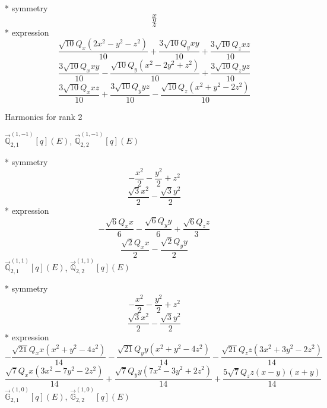 \documentclass[fleqn,8pt]{jsarticle}
\begin{document}
\noindent\quad ** symmetry
\begin{dmath*}
x
\end{dmath*}
\begin{dmath*}
y
\end{dmath*}
\begin{dmath*}
z
\end{dmath*}
\noindent\quad ** expression
\begin{dmath*}
\frac{\sqrt{10} Q_{x} \left(2 x^{2} - y^{2} - z^{2}\right)}{10} + \frac{3 \sqrt{10} Q_{y} x y}{10} + \frac{3 \sqrt{10} Q_{z} x z}{10}
\end{dmath*}
\begin{dmath*}
\frac{3 \sqrt{10} Q_{x} x y}{10} - \frac{\sqrt{10} Q_{y} \left(x^{2} - 2 y^{2} + z^{2}\right)}{10} + \frac{3 \sqrt{10} Q_{z} y z}{10}
\end{dmath*}
\begin{dmath*}
\frac{3 \sqrt{10} Q_{x} x z}{10} + \frac{3 \sqrt{10} Q_{y} y z}{10} - \frac{\sqrt{10} Q_{z} \left(x^{2} + y^{2} - 2 z^{2}\right)}{10}
\end{dmath*}

\noindent * Harmonics for rank 2

\noindent\quad $\vec{\mathbb{Q}}_{2,1}^{(1,-1)}[q](E)$, $\vec{\mathbb{Q}}_{2,2}^{(1,-1)}[q](E)$

\noindent\quad ** symmetry
\begin{dmath*}
- \frac{x^{2}}{2} - \frac{y^{2}}{2} + z^{2}
\end{dmath*}
\begin{dmath*}
\frac{\sqrt{3} x^{2}}{2} - \frac{\sqrt{3} y^{2}}{2}
\end{dmath*}
\noindent\quad ** expression
\begin{dmath*}
- \frac{\sqrt{6} Q_{x} x}{6} - \frac{\sqrt{6} Q_{y} y}{6} + \frac{\sqrt{6} Q_{z} z}{3}
\end{dmath*}
\begin{dmath*}
\frac{\sqrt{2} Q_{x} x}{2} - \frac{\sqrt{2} Q_{y} y}{2}
\end{dmath*}
\noindent\quad $\vec{\mathbb{Q}}_{2,1}^{(1,1)}[q](E)$, $\vec{\mathbb{Q}}_{2,2}^{(1,1)}[q](E)$

\noindent\quad ** symmetry
\begin{dmath*}
- \frac{x^{2}}{2} - \frac{y^{2}}{2} + z^{2}
\end{dmath*}
\begin{dmath*}
\frac{\sqrt{3} x^{2}}{2} - \frac{\sqrt{3} y^{2}}{2}
\end{dmath*}
\noindent\quad ** expression
\begin{dmath*}
- \frac{\sqrt{21} Q_{x} x \left(x^{2} + y^{2} - 4 z^{2}\right)}{14} - \frac{\sqrt{21} Q_{y} y \left(x^{2} + y^{2} - 4 z^{2}\right)}{14} - \frac{\sqrt{21} Q_{z} z \left(3 x^{2} + 3 y^{2} - 2 z^{2}\right)}{14}
\end{dmath*}
\begin{dmath*}
\frac{\sqrt{7} Q_{x} x \left(3 x^{2} - 7 y^{2} - 2 z^{2}\right)}{14} + \frac{\sqrt{7} Q_{y} y \left(7 x^{2} - 3 y^{2} + 2 z^{2}\right)}{14} + \frac{5 \sqrt{7} Q_{z} z \left(x - y\right) \left(x + y\right)}{14}
\end{dmath*}
\noindent\quad $\vec{\mathbb{G}}_{2,1}^{(1,0)}[q](E)$, $\vec{\mathbb{G}}_{2,2}^{(1,0)}[q](E)$
\end{document}
